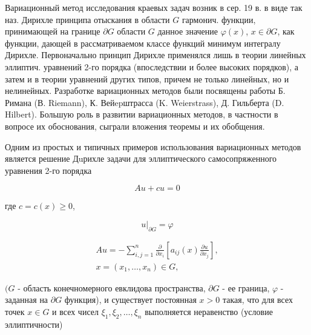 \documentclass[10pt]{article}
\begin{document}
Вариационный метод исследования краевых задач возник в сер. 19 в. в виде так наз. Дирихле принципа отыскания в области $G$ гармонич. функции, принимающей на границе $\partial G$ области $G$ данное значение $\varphi(x)$, $x \in \partial G$, как функции, дающей в рассматриваемом классе функций минимум интегралу Дирихле. Первоначально принцип Дирихле применялся лишь в теории линейных эллиптич. уравнений 2-го порядка (впоследствии и более высоких порядков), а затем и в теории уравнений других типов, причем не только линейных, но и нелинейных. Разработке вариационных методов были посвящены работы Б. Римана (В. Riemann), К. Вейepштрасса (K. Weierstrass), Д. Гильберта (D. Hilbert). Большую роль в развитии вариационных методов, в частности в вопросе их обоснования, сыграли вложения теоремы и их обобщения.



Одним из простых и типичных примеров использования вариационных методов является решение Дuрихле задачи для эллиптического самосопряженного уравнения 2-го порядка



\[

A u+c u=0

\]



где $c=c(x) \geqslant 0$,



\[

\left.u\right|_{\partial G}=\varphi

\]



\[

\begin{gathered}

A u=-\sum_{i, j=1}^{n} \frac{\partial}{\partial x_{i}}\left[a_{i j}(x) \frac{\partial u}{\partial x_{j}}\right], \\

x=\left(x_{1}, \ldots, x_{n}\right) \in G,

\end{gathered}

\]



$(G$ - область конечномерного евклидова пространства, $\partial G$ - ее граница, $\varphi$ - заданная на $\partial G$ функция), и существует постоянная $x>0$ такая, что для всех точек $x \in G$ и всех чисел $\xi_{1}, \xi_{2}, \ldots, \xi_{n}$ выполняется неравенство (условие эллиптичности)
\end{document}
